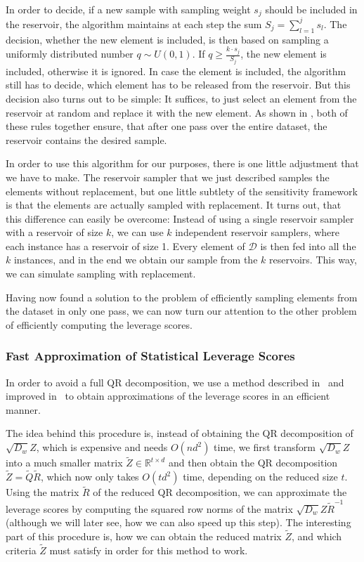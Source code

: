 In order to decide, if a new sample with sampling weight $s_j$ should be
included in the reservoir, the algorithm maintains at each step
the sum $S_j = \sum_{l=1}^j s_l$. The decision, whether
the new element is included, is then based on sampling
a uniformly distributed number $q \sim U(0, 1)$.
If $q \geq \frac{k \cdot s_j}{S_j}$, the new element is included,
otherwise it is ignored. In case the element is included, the
algorithm still has to decide, which element has to be released
from the reservoir. But this decision also turns out to be simple:
It suffices, to just select an element from the reservoir at
random and replace it with the new element.
As shown in \cite{reservoir-sampler}, both of these rules together
ensure, that after one pass over the entire dataset, the
reservoir contains the desired sample.

In order to use this algorithm for our purposes, there is one
little adjustment that we have to make. The reservoir sampler
that we just described samples the elements without replacement,
but one little subtlety of the sensitivity framework is that the
elements are actually sampled with replacement.
It turns out, that this difference can easily be overcome:
Instead of using a single reservoir sampler with a reservoir of
size $k$, we can use $k$ independent reservoir samplers, where
each instance has a reservoir of size 1. Every element of
$\mathcal{D}$ is then fed into all the $k$ instances, and in the
end we obtain our sample from the $k$ reservoirs. This way,
we can simulate sampling with replacement.

Having now found a solution to the problem of efficiently sampling
elements from the dataset in only one pass, we can now turn
our attention to the other problem of efficiently computing
the leverage scores.

\subsubsection{Fast Approximation of Statistical Leverage Scores}

In order to avoid a full QR decomposition, we use a method
described in~\cite{leverage-scores-drineas} and improved
in~\cite{woodruff-2017} to obtain approximations of the
leverage scores in an efficient manner.

The idea behind this procedure is, instead of obtaining the QR
decomposition of $\sqrt{D_w}Z$, which is expensive and needs
$O(nd^2)$ time, we first transform $\sqrt{D_w}Z$ into a
much smaller matrix $\tilde Z \in \mathbb{R}^{t \times d}$
and then obtain the QR decomposition $\tilde{Z} = \tilde Q \tilde R$,
which now only takes $O(td^2)$ time, depending on the
reduced size $t$.
Using the matrix $\tilde{R}$ of the reduced QR decomposition, we
can approximate the leverage scores by computing the squared row norms of
the matrix $\sqrt{D_w}Z \tilde{R}^{-1}$ (although we will later
see, how we can also speed up this step).
The interesting part of this procedure is, how we can obtain
the reduced matrix $\tilde{Z}$, and which criteria $\tilde{Z}$
must satisfy in order for this method to work.

